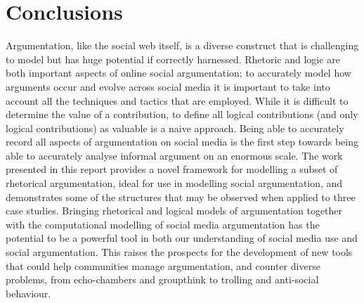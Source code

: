 \section{Conclusions}
Argumentation, like the social web itself, is a diverse construct that is challenging to model but has huge potential if correctly harnessed. Rhetoric and logic are both important aspects of online social argumentation; to accurately model how arguments occur and evolve across social media it is important to take into account all the techniques and tactics that are employed. While it is difficult to determine the value of a contribution, to define all logical contributions (and only logical contributions) as valuable is a naive approach. Being able to accurately record all aspects of argumentation on social media is the first step towards being able to accurately analyse informal argument on an enormous scale. The work presented in this report provides a novel framework for modelling a subset of rhetorical argumentation, ideal for use in modelling social argumentation, and demonstrates some of the structures that may be observed when applied to three case studies. Bringing rhetorical and logical models of argumentation together with the computational modelling of social media argumentation has the potential to be a powerful tool in both our understanding of social media use and social argumentation. This raises the prospects for the development of new tools that could help communities manage argumentation, and counter diverse problems, from echo-chambers and groupthink to trolling and anti-social behaviour.